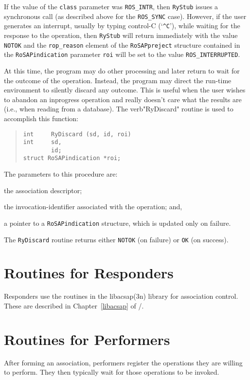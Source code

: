 If the value of the \verb"class" parameter was \verb"ROS_INTR",
then \verb"RyStub" issues a synchronous call
(as described above for the \verb"ROS_SYNC" case).
However, if the user generates an interrupt,
usually by typing control-C (`\verb"^C"'),
while waiting for the response to the operation,
then \verb"RyStub" will return immediately with the value \verb"NOTOK"
and the \verb"rop_reason" element of the  \verb"RoSAPpreject" structure
contained in the \verb"RoSAPindication" parameter \verb"roi" will be set to
the value \verb"ROS_INTERRUPTED".

At this time,
the program may do other processing and later return to wait for the outcome
of the operation.
Instead,
the program may direct the run-time environment to silently discard any
outcome.
This is useful when the user wishes to abandon an inprogress operation and
really doesn't care what the results are
(i.e., when reading from a database).
The verb"RyDiscard" routine is used to accomplish this function:
\begin{quote}\small\begin{verbatim}
int     RyDiscard (sd, id, roi)
int     sd,
        id;
struct RoSAPindication *roi;
\end{verbatim}\end{quote}
The parameters to this procedure are:
\begin{describe}
\item[\verb"sd":] the association descriptor;

\item[\verb"sd":] the invocation-identifier associated with the operation; and,

\item[\verb"roi":] a pointer to a \verb"RoSAPindication" structure,
which is updated only on failure.
\end{describe}
The \verb"RyDiscard" routine returns either \verb"NOTOK" (on failure)
or \verb"OK" (on success).

\section	{Routines for Responders}
Responders use the routines in the \man libacsap(3n) library for association
control.
These are described in Chapter~\ref{libacsap} of \volone/.

\section	{Routines for Performers}
After forming an association,
performers register the operations they are willing to perform.
They then typically wait for those operations to be invoked.


